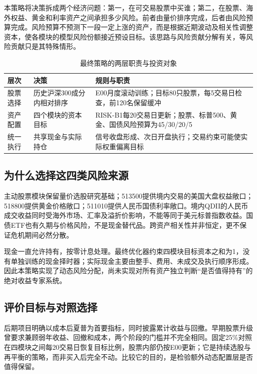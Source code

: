 \documentclass[11pt,a4paper]{article}
\begin{document}
本策略将决策拆成两个经济问题：第一，在可交易股票中买谁；第二，在股票、海外权益、黄金和利率资产之间承担多少风险。前者由量价排序完成，后者由风险预算完成。风险预算不预测下一段一定上涨的资产，而是根据近期波动及相关性调整资本，使各模块的模型风险份额接近预设目标。该思路与风险贡献分解有关，等风险贡献只是其特殊情形\cite{erc}。

\begin{table}[htbp]\centering\small
\caption{最终策略的两层职责与投资对象}\label{tab:framework}
\begin{tabular}{@{}p{2.3cm}p{5.0cm}p{7.0cm}@{}}\toprule
层次 & 决策 & 规则与职责 \\\midrule
股票选择 & 历史沪深300成分内相对排序 & E00月度滚动训练；目标80只股票，每5交易日检查，前120名保留缓冲 \\
资产配置 & 四个模块的资本目标 & RISK-B1每20交易日更新；股票、标普500、黄金、国债风险预算为45/30/20/5 \\
统一执行 & 共享现金与实际持仓 & 信号收盘形成、次日开盘执行；交易约束可能使实际权重偏离目标 \\
\bottomrule\end{tabular}\end{table}

\subsection{为什么选择这四类风险来源}
主动股票模块保留量价选股研究基础；513500提供境内交易的美国大盘权益敞口；518800提供黄金价格敞口；511010提供人民币国债利率敞口。境内QDII的人民币成交收益同时受海外市场、汇率及溢折价影响，不能等同于美元标普指数收益。国债ETF也有久期与价格风险，不是现金替代品。跨资产相关性并非恒定，更不保证危机期间必然分散。

现金一直允许持有，按零计息处理。最终优化器约束四模块目标资本之和为1，没有单独训练的现金择时器；实际现金主要由整手、费用、未成交及执行顺序形成。因此本策略实现了动态风险分配，尚未实现对所有资产独立判断“是否值得持有”的绝对收益专家系统。

\subsection{评价目标与对照选择}
后期项目明确以成本后夏普为首要指标，同时披露累计收益与回撤。早期股票升级曾要求兼顾弱年收益、回撤和成本，两个阶段的门槛并不完全相同。固定25\%对照在四模块之间每20交易日恢复目标比例，股票内部仍按E00更新；它是持续选股与再平衡的策略，而非买入后完全不动。比较它的目的，是检验额外动态配置层是否值得保留。

\clearpage
\end{document}

